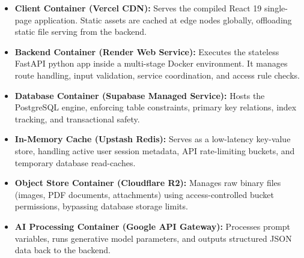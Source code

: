 \begin{itemize}
    \item \textbf{Client Container (Vercel CDN):} Serves the compiled React 19 single-page application. Static assets are cached at edge nodes globally, offloading static file serving from the backend.
    \item \textbf{Backend Container (Render Web Service):} Executes the stateless FastAPI python app inside a multi-stage Docker environment. It manages route handling, input validation, service coordination, and access rule checks.
    \item \textbf{Database Container (Supabase Managed Service):} Hosts the PostgreSQL engine, enforcing table constraints, primary key relations, index tracking, and transactional safety.
    \item \textbf{In-Memory Cache (Upstash Redis):} Serves as a low-latency key-value store, handling active user session metadata, API rate-limiting buckets, and temporary database read-caches.
    \item \textbf{Object Store Container (Cloudflare R2):} Manages raw binary files (images, PDF documents, attachments) using access-controlled bucket permissions, bypassing database storage limits.
    \item \textbf{AI Processing Container (Google API Gateway):} Processes prompt variables, runs generative model parameters, and outputs structured JSON data back to the backend.
\end{itemize}

